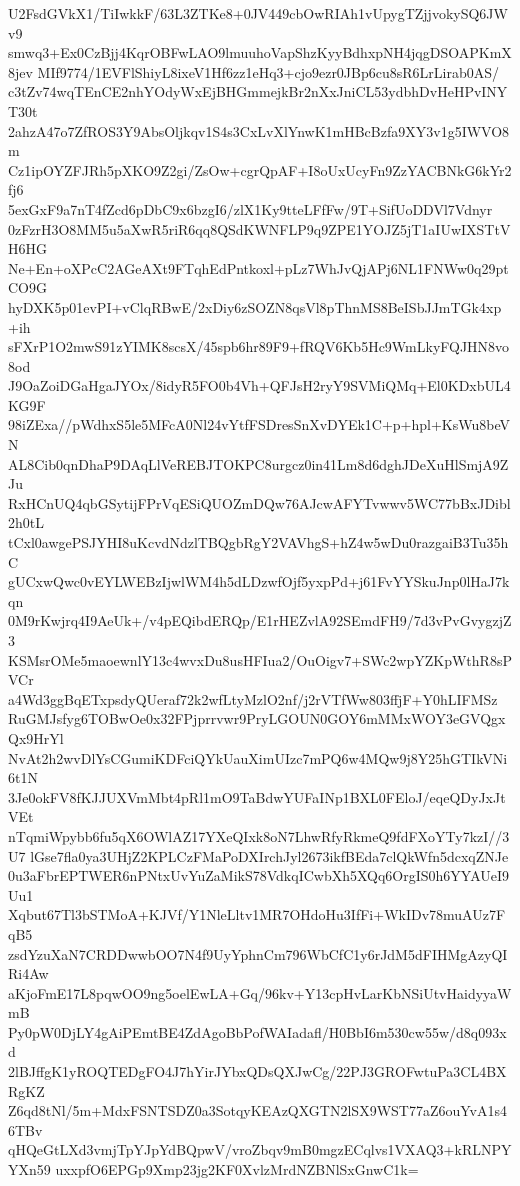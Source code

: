 U2FsdGVkX1/TiIwkkF/63L3ZTKe8+0JV449cbOwRIAh1vUpygTZjjvokySQ6JWv9
smwq3+Ex0CzBjj4KqrOBFwLAO9lmuuhoVapShzKyyBdhxpNH4jqgDSOAPKmX8jev
MIf9774/1EVFlShiyL8ixeV1Hf6zz1eHq3+cjo9ezr0JBp6cu8sR6LrLirab0AS/
c3tZv74wqTEnCE2nhYOdyWxEjBHGmmejkBr2nXxJniCL53ydbhDvHeHPvINYT30t
2ahzA47o7ZfROS3Y9AbsOljkqv1S4s3CxLvXlYnwK1mHBcBzfa9XY3v1g5IWVO8m
Cz1ipOYZFJRh5pXKO9Z2gi/ZsOw+cgrQpAF+I8oUxUcyFn9ZzYACBNkG6kYr2fj6
5exGxF9a7nT4fZcd6pDbC9x6bzgI6/zlX1Ky9tteLFfFw/9T+SifUoDDVl7Vdnyr
0zFzrH3O8MM5u5aXwR5riR6qq8QSdKWNFLP9q9ZPE1YOJZ5jT1aIUwIXSTtVH6HG
Ne+En+oXPcC2AGeAXt9FTqhEdPntkoxl+pLz7WhJvQjAPj6NL1FNWw0q29ptCO9G
hyDXK5p01evPI+vClqRBwE/2xDiy6zSOZN8qsVl8pThnMS8BeISbJJmTGk4xp+ih
sFXrP1O2mwS91zYIMK8scsX/45spb6hr89F9+fRQV6Kb5Hc9WmLkyFQJHN8vo8od
J9OaZoiDGaHgaJYOx/8idyR5FO0b4Vh+QFJsH2ryY9SVMiQMq+El0KDxbUL4KG9F
98iZExa//pWdhxS5le5MFcA0Nl24vYtfFSDresSnXvDYEk1C+p+hpl+KsWu8beVN
AL8Cib0qnDhaP9DAqLlVeREBJTOKPC8urgcz0in41Lm8d6dghJDeXuHlSmjA9ZJu
RxHCnUQ4qbGSytijFPrVqESiQUOZmDQw76AJcwAFYTvwwv5WC77bBxJDibl2h0tL
tCxl0awgePSJYHI8uKcvdNdzlTBQgbRgY2VAVhgS+hZ4w5wDu0razgaiB3Tu35hC
gUCxwQwc0vEYLWEBzIjwlWM4h5dLDzwfOjf5yxpPd+j61FvYYSkuJnp0lHaJ7kqn
0M9rKwjrq4I9AeUk+/v4pEQibdERQp/E1rHEZvlA92SEmdFH9/7d3vPvGvygzjZ3
KSMsrOMe5maoewnlY13c4wvxDu8usHFIua2/OuOigv7+SWc2wpYZKpWthR8sPVCr
a4Wd3ggBqETxpsdyQUeraf72k2wfLtyMzlO2nf/j2rVTfWw803ffjF+Y0hLIFMSz
RuGMJsfyg6TOBwOe0x32FPjprrvwr9PryLGOUN0GOY6mMMxWOY3eGVQgxQx9HrYl
NvAt2h2wvDlYsCGumiKDFciQYkUauXimUIzc7mPQ6w4MQw9j8Y25hGTIkVNi6t1N
3Je0okFV8fKJJUXVmMbt4pRl1mO9TaBdwYUFaINp1BXL0FEloJ/eqeQDyJxJtVEt
nTqmiWpybb6fu5qX6OWlAZ17YXeQIxk8oN7LhwRfyRkmeQ9fdFXoYTy7kzI//3U7
lGse7fla0ya3UHjZ2KPLCzFMaPoDXIrchJyl2673ikfBEda7clQkWfn5dcxqZNJe
0u3aFbrEPTWER6nPNtxUvYuZaMikS78VdkqICwbXh5XQq6OrgIS0h6YYAUeI9Uu1
Xqbut67Tl3bSTMoA+KJVf/Y1NleLltv1MR7OHdoHu3IfFi+WkIDv78muAUz7FqB5
zsdYzuXaN7CRDDwwbOO7N4f9UyYphnCm796WbCfC1y6rJdM5dFIHMgAzyQIRi4Aw
aKjoFmE17L8pqwOO9ng5oelEwLA+Gq/96kv+Y13cpHvLarKbNSiUtvHaidyyaWmB
Py0pW0DjLY4gAiPEmtBE4ZdAgoBbPofWAIadafl/H0BbI6m530cw55w/d8q093xd
2lBJffgK1yROQTEDgFO4J7hYirJYbxQDsQXJwCg/22PJ3GROFwtuPa3CL4BXRgKZ
Z6qd8tNl/5m+MdxFSNTSDZ0a3SotqyKEAzQXGTN2lSX9WST77aZ6ouYvA1s46TBv
qHQeGtLXd3vmjTpYJpYdBQpwV/vroZbqv9mB0mgzECqlvs1VXAQ3+kRLNPYYXn59
uxxpfO6EPGp9Xmp23jg2KF0XvlzMrdNZBNlSxGnwC1k=
